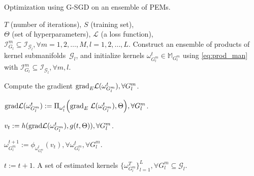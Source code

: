 \documentclass[10pt,journal,compsoc]{IEEEtran}
\newcommand{\gr}{{\rm grad}}
\theoremstyle{definition}
\theoremstyle{definition}
\theoremstyle{remark}
\theoremstyle{remark}
\theoremstyle{remark}
\begin{document}
\begin{algorithm}[tb]
	\caption{Optimization using G-SGD on an ensemble of PEMs.}
	\begin{algorithmic}[1]
		 $T$ (number of iterations), $S$ (training set), \\ $\Theta$ (set of hyperparameters), $\mathcal{L}$ (a loss function), ${\mathcal{I}^m_{{G}_l} \subseteq \mathcal{I}_{\mathcal{G}_l}}, \forall m=1,2,\ldots,M, l=1,2,\ldots,L$.
		 Construct an ensemble of products of kernel submanifolds~$ \mathcal{G}_l$, and initialize kernels
		${ \omega_{G^m_l}^t \in \mathbb{M}_{G^m_l} }$ using \eqref{eq:prod_man} with ${\mathcal{I}^m_{{G}_l} \subseteq \mathcal{I}_{\mathcal{G}_l}}, \forall m,l$.
		
		\STATE Compute the gradient $\gr_E \mathcal{L}(\omega_{G^m_l}^{t}),\forall {G^m_l}$.
		
		
		\STATE ${
		\gr \mathcal{L}(\omega_{G^m_l}^{t}) := {\rm \Pi}_{\omega_l^t}  \Big ( \gr_E \; \mathcal{L}(\omega_{G^m_l}^{t}),\Theta \Big)},\forall {G^m_l}$.
		
		
		
		
		\STATE $ v_t := h(\gr \mathcal{L}(\omega_{G^m_l}^{t}), g(t,\Theta)), \forall {G^m_l}$.
		
		\STATE $
		\omega_{G^m_l}^{t+1} := \phi_{\omega_{G^m_l}^t}(  v_t), \forall \omega_{G^m_l}^t, \forall {G^m_l}$.
		
		
		\STATE $ t := t+1$.
		\ENDFOR
		\ENDFOR
		 A set of estimated kernels $\{\omega_{G^m_l}^T \}_{l=1}^{{L}}, {\forall {G^m_l} \subseteq \mathcal{G}_l}$.
			\label{alg1}
			
	\end{algorithmic}	
	
\end{algorithm}


\end{document}

